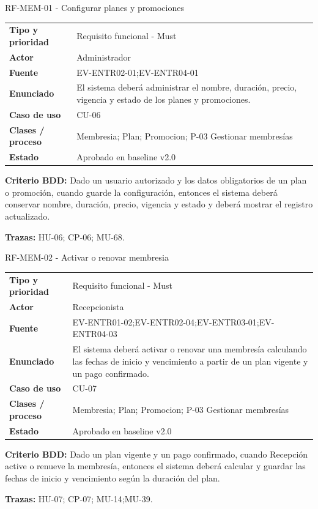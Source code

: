\begin{reqbox}{RF-MEM-01 - Configurar planes y promociones}
\begin{tabularx}{\textwidth}{>{\bfseries}p{3.2cm}Y}
Tipo y prioridad & Requisito funcional - Must \\
Actor & Administrador \\
Fuente & EV-ENTR02-01;EV-ENTR04-01 \\
Enunciado & El sistema deberá administrar el nombre, duración, precio, vigencia y estado de los planes y promociones. \\
Caso de uso & CU-06 \\
Clases / proceso & Membresia; Plan; Promocion; P-03 Gestionar membresías \\
Estado & Aprobado en baseline v2.0 \\
\end{tabularx}
\textbf{Criterio BDD:} Dado un usuario autorizado y los datos obligatorios de un plan o promoción, cuando guarde la configuración, entonces el sistema deberá conservar nombre, duración, precio, vigencia y estado y deberá mostrar el registro actualizado.

\textbf{Trazas:} HU-06; CP-06; MU-68.
\end{reqbox}


\begin{reqbox}{RF-MEM-02 - Activar o renovar membresia}
\begin{tabularx}{\textwidth}{>{\bfseries}p{3.2cm}Y}
Tipo y prioridad & Requisito funcional - Must \\
Actor & Recepcionista \\
Fuente & EV-ENTR01-02;EV-ENTR02-04;EV-ENTR03-01;EV-ENTR04-03 \\
Enunciado & El sistema deberá activar o renovar una membresía calculando las fechas de inicio y vencimiento a partir de un plan vigente y un pago confirmado. \\
Caso de uso & CU-07 \\
Clases / proceso & Membresia; Plan; Promocion; P-03 Gestionar membresías \\
Estado & Aprobado en baseline v2.0 \\
\end{tabularx}
\textbf{Criterio BDD:} Dado un plan vigente y un pago confirmado, cuando Recepción active o renueve la membresía, entonces el sistema deberá calcular y guardar las fechas de inicio y vencimiento según la duración del plan.

\textbf{Trazas:} HU-07; CP-07; MU-14;MU-39.
\end{reqbox}



